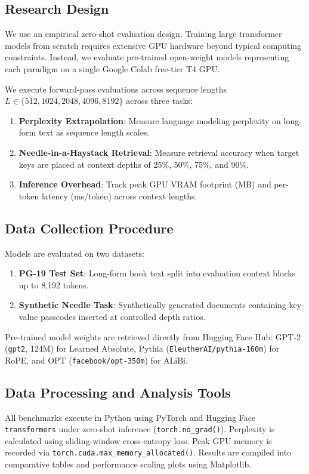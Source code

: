 \documentclass[conference]{IEEEtran}
\begin{document}
\subsection{Research Design}

We use an empirical zero-shot evaluation design. Training large transformer models from scratch requires extensive GPU hardware beyond typical computing constraints. Instead, we evaluate pre-trained open-weight models representing each paradigm on a single Google Colab free-tier T4 GPU.

We execute forward-pass evaluations across sequence lengths $L \in \{512, 1024, 2048, 4096, 8192\}$ across three tasks:
\begin{enumerate}
\item \textbf{Perplexity Extrapolation}: Measure language modeling perplexity on long-form text as sequence length scales.
\item \textbf{Needle-in-a-Haystack Retrieval}: Measure retrieval accuracy when target keys are placed at context depths of 25\%, 50\%, 75\%, and 90\%.
\item \textbf{Inference Overhead}: Track peak GPU VRAM footprint (MB) and per-token latency (ms/token) across context lengths.
\end{enumerate}

\subsection{Data Collection Procedure}

Models are evaluated on two datasets:
\begin{enumerate}
\item \textbf{PG-19 Test Set}: Long-form book text split into evaluation context blocks up to 8,192 tokens.
\item \textbf{Synthetic Needle Task}: Synthetically generated documents containing key-value passcodes inserted at controlled depth ratios.
\end{enumerate}
Pre-trained model weights are retrieved directly from Hugging Face Hub: GPT-2 (\texttt{gpt2}, 124M) for Learned Absolute, Pythia (\texttt{EleutherAI/pythia-160m}) for RoPE, and OPT (\texttt{facebook/opt-350m}) for ALiBi.

\subsection{Data Processing and Analysis Tools}

All benchmarks execute in Python using PyTorch and Hugging Face \texttt{transformers} under zero-shot inference (\texttt{torch.no_grad()}). Perplexity is calculated using sliding-window cross-entropy loss. Peak GPU memory is recorded via \texttt{torch.cuda.max\_memory\_allocated()}. Results are compiled into comparative tables and performance scaling plots using Matplotlib.
\end{document}
